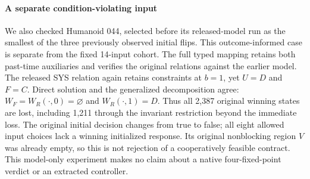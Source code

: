 \paragraph{A separate condition-violating input}
We also checked Humanoid 044, selected before its released-model run
as the smallest of the three previously observed initial flips.
This outcome-informed case is separate from the fixed 14-input cohort.
The full typed mapping retains both past-time auxiliaries and verifies
the original relations against the earlier model. The released SYS
relation again retains constraints at $b=1$, yet $U=D$ and $F=C$.
Direct solution and the generalized decomposition agree:
$W_F=W_R(\cdot,0)=\varnothing$ and $W_R(\cdot,1)=D$.
Thus all 2,387 original winning states are lost, including 1,211
through the invariant restriction beyond the immediate loss.
The original initial decision changes from true to false; all eight
allowed input choices lack a winning initialized response.
Its original
nonblocking region $V$ was already empty, so this is not rejection
of a cooperatively feasible contract. This model-only
experiment makes no claim about a native four-fixed-point verdict
or an extracted controller.

